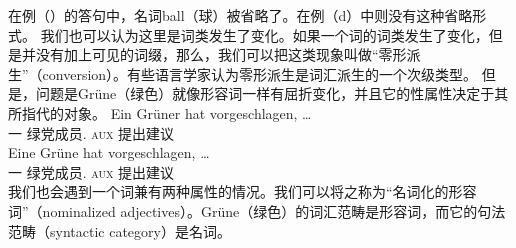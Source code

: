 \noindent
在例（）的答句中，名词ball（球）被省略了。在例（d）中则没有这种省略形式。
我们也可以认为这里是词类发生了变化。如果一个词的词类发生了变化，但是并没有加上可见的词缀，那么，我们可以把这类现象叫做“零形派生”（conversion）。有些语言学家认为零形派生是词汇派生的一个次级类型。
但是，问题是Grüne（绿色）就像形容词一样有屈折变化，并且它的性属性决定于其所指代的对象。
\eal
\ex 
\gll Ein Grüner hat vorgeschlagen, \ldots\\
	 一 绿党成员.\mas{} \textsc{aux} 提出建议\\
\ex 
\gll Eine Grüne hat vorgeschlagen, \ldots\\
	 一 绿党成员.\fem{} \textsc{aux} 提出建议\\
\zl
我们也会遇到一个词兼有两种属性的情况。我们可以将之称为“名词化的形容词”（nominalized adjectives）。Grüne（绿色）的词汇范畴是形容词，而它的句法范畴（syntactic category）是名词。

